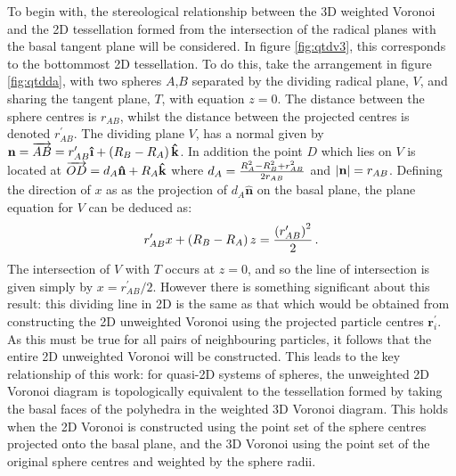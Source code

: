 To begin with, the stereological relationship between the 3D weighted Voronoi and the 2D tessellation formed from the intersection of the radical planes with the basal tangent plane will be considered.
In figure \ref{fig:qtdv3}, this corresponds to the bottommost 2D tessellation.
To do this, take the arrangement in figure \ref{fig:qtdda}, with two spheres $A$,$B$ separated by the dividing radical plane, $V$, and sharing the tangent plane, $T$, with equation $z=0$.
The distance between the sphere centres is $r_{AB}$, whilst the distance between the projected centres is denoted $r_{AB}^\prime$.
The dividing plane $V$, has a normal given by $\mathbf{n} =\overrightarrow{AB}=r_{AB}^\prime\boldsymbol{\hat{\textbf{\i}}}+\left(\rs_B-\rs_A\right)\mathbf{\hat{k}}$.
In addition the point $D$ which lies on $V$ is located at $\overrightarrow{OD}=d_{A}\mathbf{\hat{n}}+R_A\mathbf{\hat{k}}$ where $d_{A}=\frac{R_A^2-R_B^2+r_{AB}^2}{2r_{AB}}$ and $\lvert\mathbf{n}\rvert=r_{AB}$.
Defining the direction of $x$ as as the projection of $d_A\mathbf{\hat{n}}$ on the basal plane, the plane equation for $V$ can be deduced as:
\begin{equation}
	\label{eq:plane}
	r_{AB}^\prime x+\left(R_B-R_A\right)z=\frac{\left(r_{AB}^\prime\right)^2}{2}\,.
\end{equation}
The intersection of $V$ with $T$ occurs at $z=0$, and so the line of intersection is given simply by $x=r_{AB}^\prime/2$.
However there is something significant about this result: this dividing line in 2D is the same as that which would be obtained from constructing the 2D unweighted Voronoi using the projected particle centres $\mathbf{r}^\prime_i$.
As this must be true for all pairs of neighbouring particles, it follows that the entire 2D unweighted Voronoi will be constructed. 
This leads to the key relationship of this work: for quasi\--2D systems of spheres, the unweighted 2D Voronoi diagram is topologically equivalent to the tessellation formed by taking the basal faces of the polyhedra in the weighted 3D Voronoi diagram. 
This holds when the 2D Voronoi is constructed using the point set of the sphere centres projected onto the basal plane, and the 3D Voronoi using the point set of the original sphere centres and weighted by the sphere radii.

